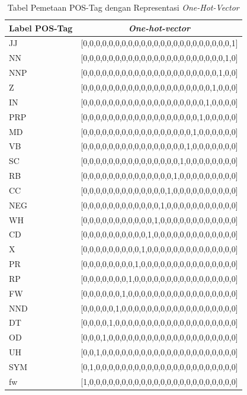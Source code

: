 \begin{enumerate}
	\begin{table}
		\centering
		\caption{Tabel Pemetaan POS-Tag dengan Representasi \textit{One-Hot-Vector}}
		\label{table:onehotpostag}
		\begin{tabular}{|l|l|}
			\hline
			\multicolumn{1}{|c|}{Label POS-Tag} & \multicolumn{1}{c|}{\textit{One-hot-vector}} \\ \hline
			JJ & {[}0,0,0,0,0,0,0,0,0,0,0,0,0,0,0,0,0,0,0,0,0,0,0,1{]} \\ \hline
			NN & {[}0,0,0,0,0,0,0,0,0,0,0,0,0,0,0,0,0,0,0,0,0,0,1,0{]} \\ \hline
			NNP & {[}0,0,0,0,0,0,0,0,0,0,0,0,0,0,0,0,0,0,0,0,0,1,0,0{]} \\ \hline
			Z & {[}0,0,0,0,0,0,0,0,0,0,0,0,0,0,0,0,0,0,0,0,1,0,0,0{]} \\ \hline
			IN & {[}0,0,0,0,0,0,0,0,0,0,0,0,0,0,0,0,0,0,0,1,0,0,0,0{]} \\ \hline
			PRP & {[}0,0,0,0,0,0,0,0,0,0,0,0,0,0,0,0,0,0,1,0,0,0,0,0{]} \\ \hline
			MD & {[}0,0,0,0,0,0,0,0,0,0,0,0,0,0,0,0,0,1,0,0,0,0,0,0{]} \\ \hline
			VB & {[}0,0,0,0,0,0,0,0,0,0,0,0,0,0,0,0,1,0,0,0,0,0,0,0{]} \\ \hline
			SC & {[}0,0,0,0,0,0,0,0,0,0,0,0,0,0,0,1,0,0,0,0,0,0,0,0{]} \\ \hline
			RB & {[}0,0,0,0,0,0,0,0,0,0,0,0,0,0,1,0,0,0,0,0,0,0,0,0{]} \\ \hline
			CC & {[}0,0,0,0,0,0,0,0,0,0,0,0,0,1,0,0,0,0,0,0,0,0,0,0{]} \\ \hline
			NEG & {[}0,0,0,0,0,0,0,0,0,0,0,0,1,0,0,0,0,0,0,0,0,0,0,0{]} \\ \hline
			WH & {[}0,0,0,0,0,0,0,0,0,0,0,1,0,0,0,0,0,0,0,0,0,0,0,0{]} \\ \hline
			CD & {[}0,0,0,0,0,0,0,0,0,0,1,0,0,0,0,0,0,0,0,0,0,0,0,0{]} \\ \hline
			X & {[}0,0,0,0,0,0,0,0,0,1,0,0,0,0,0,0,0,0,0,0,0,0,0,0{]} \\ \hline
			PR & {[}0,0,0,0,0,0,0,0,1,0,0,0,0,0,0,0,0,0,0,0,0,0,0,0{]} \\ \hline
			RP & {[}0,0,0,0,0,0,0,1,0,0,0,0,0,0,0,0,0,0,0,0,0,0,0,0{]} \\ \hline
			FW & {[}0,0,0,0,0,0,1,0,0,0,0,0,0,0,0,0,0,0,0,0,0,0,0,0{]} \\ \hline
			NND & {[}0,0,0,0,0,1,0,0,0,0,0,0,0,0,0,0,0,0,0,0,0,0,0,0{]} \\ \hline
			DT & {[}0,0,0,0,1,0,0,0,0,0,0,0,0,0,0,0,0,0,0,0,0,0,0,0{]} \\ \hline
			OD & {[}0,0,0,1,0,0,0,0,0,0,0,0,0,0,0,0,0,0,0,0,0,0,0,0{]} \\ \hline
			UH & {[}0,0,1,0,0,0,0,0,0,0,0,0,0,0,0,0,0,0,0,0,0,0,0,0{]} \\ \hline
			SYM & {[}0,1,0,0,0,0,0,0,0,0,0,0,0,0,0,0,0,0,0,0,0,0,0,0{]} \\ \hline
			fw & {[}1,0,0,0,0,0,0,0,0,0,0,0,0,0,0,0,0,0,0,0,0,0,0,0{]} \\ \hline
		\end{tabular}
	\end{table}


\end{enumerate}
